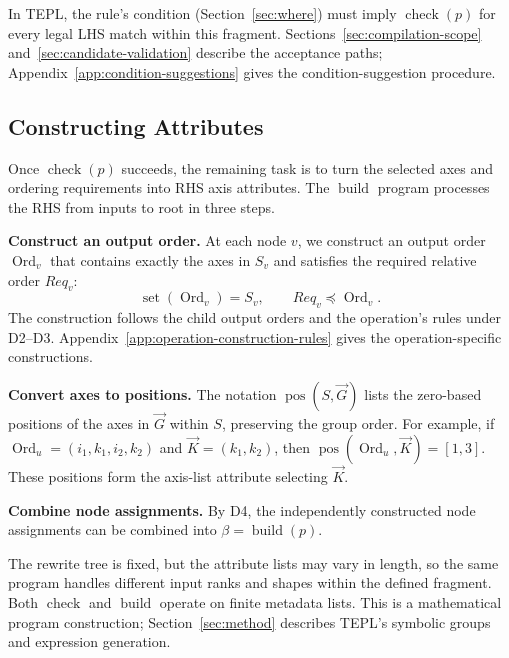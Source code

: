 In TEPL, the rule's  condition (Section~\ref{sec:where}) must
imply $\operatorname{check}(p)$ for every legal LHS match within this
fragment. Sections~\ref{sec:compilation-scope} and~\ref{sec:candidate-validation}
describe the acceptance paths; Appendix~\ref{app:condition-suggestions}
gives the condition-suggestion procedure.

\subsection{Constructing Attributes}
\label{sec:formal-construction}
Once $\operatorname{check}(p)$ succeeds, the remaining task is to turn
the selected axes and ordering requirements into RHS axis attributes.
The $\operatorname{build}$ program processes the RHS from inputs to root
in three steps.

\noindent\textbf{Construct an output order.}
At each node $v$, we construct an output order $\operatorname{Ord}_v$
that contains exactly the axes in $S_v$ and satisfies the required
relative order $Req_v$:
\begin{equation}
 \operatorname{set}(\operatorname{Ord}_v)=S_v,
 \qquad Req_v\preceq\operatorname{Ord}_v.
 \label{eq:order-invariant}
\end{equation}
The construction follows the child output orders and the operation's
rules under D2--D3. Appendix~\ref{app:operation-construction-rules}
gives the operation-specific constructions.

\noindent\textbf{Convert axes to positions.}
The notation $\operatorname{pos}(S,\vec G)$ lists the zero-based positions
of the axes in $\vec G$ within $S$, preserving the group order.
For example, if $\operatorname{Ord}_u=(i_1,k_1,i_2,k_2)$ and
$\vec K=(k_1,k_2)$, then
$\operatorname{pos}(\operatorname{Ord}_u,\vec K)=[1,3]$.
These positions form the axis-list attribute selecting $\vec K$.

\noindent\textbf{Combine node assignments.}
By D4, the independently constructed node assignments can be combined
into $\beta=\operatorname{build}(p)$.

The rewrite tree is fixed, but the
attribute lists may vary in length, so the same program handles different
input ranks and shapes within the defined fragment. Both $\operatorname{check}$
and $\operatorname{build}$ operate on finite metadata lists.
This is a mathematical program construction; Section~\ref{sec:method}
describes TEPL's symbolic groups and expression generation.
